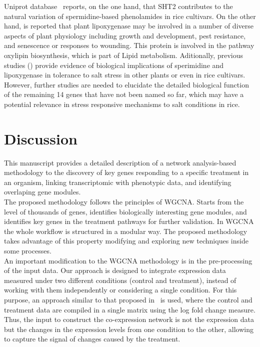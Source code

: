 \documentclass[12pt,journal, onecolumn]{IEEEtran}
\begin{document}
Uniprot database~\cite{uniprot2018uniprot} reports, on the one hand, that SHT2 contributes to the natural variation of spermidine-based phenolamides in rice cultivars. On the other hand, is reported that plant lipoxygenase may be involved in a number of diverse aspects of plant physiology including growth and development, pest resistance, and senescence or responses to wounding. This protein is involved in the pathway oxylipin biosynthesis, which is part of Lipid metabolism. Aditionally, previous studies (\cite{gupta2013plant, hou2015persimmon, mittova2002salt, peng2019novel, roychoudhury2011amelioration}) provide evidence of biological implications of sperimidine and lipoxygenase in tolerance to salt stress in other plants or even in rice cultivars. However, further studies are needed to elucidate the detailed biological function of the remaining 14 genes that have not been named so far,  which may have a potential relevance in stress responsive mechanisms to salt conditions in rice.






\section{Discussion}

This manuscript provides a detailed description of a network analysis-based methodology to 
the discovery of key genes responding to a specific treatment in an organism, linking transcriptomic with phenotypic data, and identifying overlaping gene modules.\\

The proposed methodology follows the principles of WGCNA. Starts from the level of thousands of genes, identifies biologically interesting gene modules, and identifies key genes in the treatment pathways for further validation. In WGCNA the whole workflow is structured in a modular way. The proposed methodology takes advantage of this property modifying and exploring new techniques inside some processes.\\

An important modification to the WGCNA methodology is in the pre-processing of the input data. Our approach is designed to integrate expression data measured under two different conditions (control and treatment), instead of working with them independently or considering a single condition. For this purpose, an approach similar to that proposed in~\cite{du2019network} is used, where the control and treatment data are compiled in a single matrix using the log fold change measure. Thus, the input to construct the co-expression network is not the expression data but the changes in the expression levels from one condition to the other, allowing to capture the signal of changes caused by the treatment.\\
\end{document}
